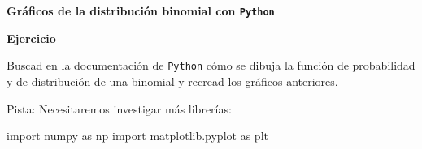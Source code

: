 \documentclass[
  letterpaper,
  DIV=11,
  numbers=noendperiod]{scrreprt}
\newenvironment{Shaded}{\begin{snugshade}}{\end{snugshade}}
\newcommand{\ImportTok}[1]{\textcolor[rgb]{0.00,0.46,0.62}{#1}}
\newcommand{\NormalTok}[1]{\textcolor[rgb]{0.00,0.23,0.31}{#1}}
\begin{document}
\textbf{Gráficos de la distribución binomial con \texttt{Python}}

\textbf{Ejercicio}

Buscad en la documentación de \texttt{Python} cómo se dibuja la función
de probabilidad y de distribución de una binomial y recread los gráficos
anteriores.

Pista: Necesitaremos investigar más librerías:

\begin{Shaded}
\begin{Highlighting}[]
\ImportTok{import}\NormalTok{ numpy }\ImportTok{as}\NormalTok{ np}
\ImportTok{import}\NormalTok{ matplotlib.pyplot }\ImportTok{as}\NormalTok{ plt}
\end{Highlighting}
\end{Shaded}
\end{document}
